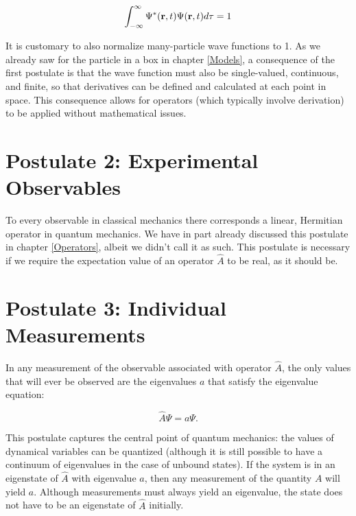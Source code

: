 \documentclass[
  9pt,
]{extbook}
\theoremstyle{definition}
\theoremstyle{definition}
\theoremstyle{definition}
\theoremstyle{remark}
\begin{document}
\begin{equation}
\int_{-\infty}^{\infty} \Psi^{*}({\bf r}, t) \Psi({\bf r}, t) d\tau = 1
\label{eq:post1}  
\end{equation}

It is customary to also normalize many-particle wave functions to 1. As we already saw for the particle in a box in chapter \ref{Models}, a consequence of the first postulate is that the wave function must also be single-valued, continuous, and finite, so that derivatives can be defined and calculated at each point in space. This consequence allows for operators (which typically involve derivation) to be applied without mathematical issues.

\hypertarget{postulate-2-experimental-observables}{%
\section{Postulate 2: Experimental Observables}\label{postulate-2-experimental-observables}}

To every observable in classical mechanics there corresponds a linear, Hermitian operator in quantum mechanics. We have in part already discussed this postulate in chapter \ref{Operators}, albeit we didn't call it as such. This postulate is necessary if we require the expectation value of an operator \(\hat{A}\) to be real, as it should be.

\hypertarget{postulate-3-individual-measurements}{%
\section{Postulate 3: Individual Measurements}\label{postulate-3-individual-measurements}}

In any measurement of the observable associated with operator \(\hat{A}\), the only values that will ever be observed are the eigenvalues \(a\) that satisfy the eigenvalue equation:

\begin{equation}
\hat{A} \Psi = a \Psi.
\label{eq:post2}  
\end{equation}

This postulate captures the central point of quantum mechanics: the values of dynamical variables can be quantized (although it is still possible to have a continuum of eigenvalues in the case of unbound states). If the system is in an eigenstate of \(\hat{A}\) with eigenvalue \(a\), then any measurement of the quantity \(A\) will yield \(a\).
Although measurements must always yield an eigenvalue, the state does not have to be an eigenstate of \(\hat{A}\) initially.
\end{document}
